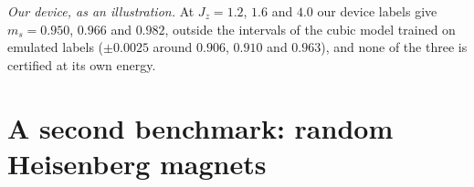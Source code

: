 \documentclass[aps,prx,onecolumn,10pt,nofootinbib,longbibliography,floatfix]{revtex4-2}
\theoremstyle{remark}
\newcommand{\Jz}{J_z}
\newcommand{\ms}{m_s}
\begin{document}
\emph{Our device, as an illustration.} At $\Jz=1.2$, $1.6$ and $4.0$ our device labels give $\ms=0.950$, $0.966$ and %
$0.982$, outside the intervals of the cubic model trained on emulated labels ($\pm 0.0025$ around $0.906$, $0.910$ and %
$0.963$), and none of the three is certified at its own energy. %

\section{A second benchmark: random Heisenberg magnets}
\label{sm:huang}
\makeatletter\providecommand{\LTclearhead}{\global\setbox\LT@head\box\voidb@x}\makeatother
\end{document}
